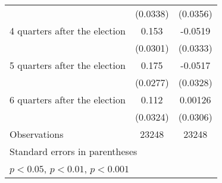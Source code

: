 \begin{table}[htbp]
\begin{tabular}{l*{2}{c}}
                    &    (0.0338)         &    (0.0356)         \\
[1em]
 4 quarters after the election&       0.153\sym{***}&     -0.0519         \\
                    &    (0.0301)         &    (0.0333)         \\
[1em]
 5 quarters after the election&       0.175\sym{***}&     -0.0517         \\
                    &    (0.0277)         &    (0.0328)         \\
[1em]
 6 quarters after the election&       0.112\sym{***}&     0.00126         \\
                    &    (0.0324)         &    (0.0306)         \\
\hline
Observations        &       23248         &       23248         \\
\hline\hline
\multicolumn{3}{l}{\footnotesize Standard errors in parentheses}\\
\multicolumn{3}{l}{\footnotesize \sym{*} \(p<0.05\), \sym{**} \(p<0.01\), \sym{***} \(p<0.001\)}\\
\end{tabular}
\end{table}
